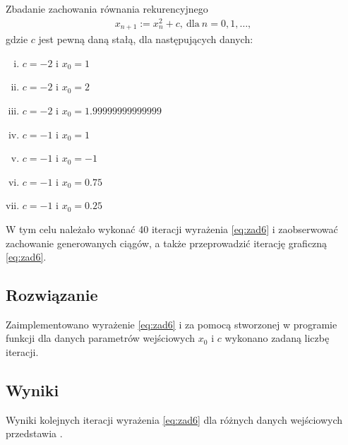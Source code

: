 \documentclass[11pt]{mk-polish-lab-report}
\begin{document}
Zbadanie zachowania równania rekurencyjnego
\begin{align}
x_{n+1} := x^2_n + c, \ \textrm{dla} \ n = 0,1,\dots,
\label{eq:zad6}
\end{align}
gdzie $c$ jest pewną daną stałą, dla następujących danych:
\begin{enumerate}[(i)]
\item $c = -2$ i $x_0 = 1$
\item $c = -2$ i $x_0 = 2$
\item $c = -2$ i $x_0 = 1.99999999999999$
\item $c = -1$ i $x_0 = 1$
\item $c = -1$ i $x_0 = -1$
\item $c = -1$ i $x_0 = 0.75$
\item $c = -1$ i $x_0 = 0.25$
\end{enumerate}
W tym celu należało wykonać 40 iteracji wyrażenia \eqref{eq:zad6} i zaobserwować zachowanie generowanych ciągów, a także przeprowadzić iterację graficzną \eqref{eq:zad6}. 

\subsection{Rozwiązanie}

Zaimplementowano wyrażenie \eqref{eq:zad6} i za pomocą stworzonej w programie funkcji dla danych parametrów wejściowych $x_0$ i $c$ wykonano zadaną liczbę iteracji.

\subsection{Wyniki}

Wyniki kolejnych iteracji wyrażenia \eqref{eq:zad6} dla różnych danych wejściowych przedstawia .
\end{document}
